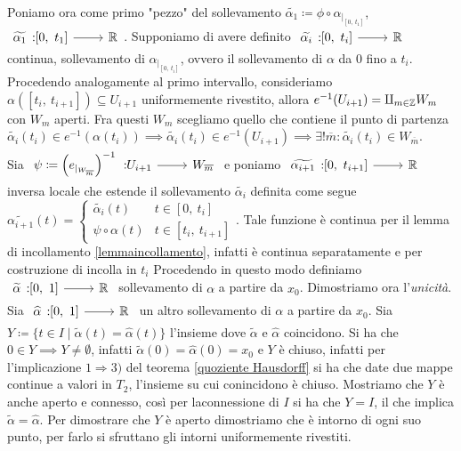 \begin{demonstration}
	Poniamo ora come primo "pezzo" del sollevamento $\widetilde{\alpha_1}\coloneqq \phi\circ \alpha_{|_{[0,\ t_1]}}$,  $\funz {\widetilde{\alpha_1}} {[0,\ t_1]} \realset$.
	Supponiamo di avere definito $\funz {\widetilde{\alpha_i}} {[0,\ t_i]} \realset$ continua, sollevamento di $\alpha_{|_{[0,\ t_i]}}$, ovvero il sollevamento di $\alpha$ da $0$ fino a $t_i$. Procedendo analogamente al primo intervallo, consideriamo $\alpha\left( [t_i,\ t_{i+1}] \right)\subseteq U_{i+1}$ uniformemente rivestito, allora $e^{-1}(U_{i+1})=\amalg_{m\in\mathbb{Z}} W_m$ con $W_m$ aperti. Fra questi $W_m$ scegliamo quello che contiene il punto di partenza \\  $\widetilde{\alpha_i}(t_i)\in e^{-1}\left( \alpha(t_i) \right) \implies \widetilde{\alpha_i}(t_i)\in e^{-1}\left( U_{i+1} \right) \implies \exists ! \overline{m} \colon \widetilde{\alpha_i}(t_i)\in W_{\overline{m}}.$\\
	Sia $\funz {\psi\coloneqq \left( e_{|_{W_{\overline{m}}}} \right)^{-1}} {U_{i+1}} {W_{\overline{m}}}$ e poniamo $\funz {\widetilde{\alpha_{i+1}}} {[0,\ t_{i+1}]} \realset$ inversa locale che estende il sollevamento $\widetilde{\alpha_i}$ definita come segue $\widetilde{\alpha_{i+1}}(t)= \begin{cases}
			\widetilde{\alpha_i}(t) & t\in [0,\ t_i]\\
			\psi\circ \alpha(t) & t\in[t_i,\ t_{i+1}]
		\end{cases}$. Tale funzione è continua per il lemma di incollamento \ref{lemmaincollamento}, infatti è continua separatamente e per costruzione di incolla in $t_i$\newline 
	Procedendo in questo modo definiamo $\funz {\widetilde{\alpha}} \intv \realset$ sollevamento di $\alpha$ a partire da $x_0$. \newline
	Dimostriamo ora l'\textit{unicità}. Sia $\funz {\widehat{\alpha}} \intv \realset$ un altro sollevamento di $\alpha$ a partire da $x_0$. Sia $Y \coloneqq \{t\in I \mid \widetilde{\alpha}(t)=\widehat{\alpha}(t)\}$ l'insieme dove $\widetilde{\alpha}$ e $\widehat{\alpha}$ coincidono. Si ha che $0\in Y \implies Y\neq\emptyset$, infatti $\widetilde{\alpha}(0)=\widehat{\alpha}(0)=x_0$  e $Y$ è chiuso, infatti per l'implicazione $1\Rightarrow 3)$ del teorema \ref{quoziente Hausdorff} si ha che date due mappe continue a valori in $T_2$, l'insieme su cui conincidono è chiuso. Mostriamo che $Y$ è anche aperto e connesso, così per laconnessione di $I$ si ha che $Y=I$, il che implica $\widetilde{\alpha}=\widehat{\alpha}$. Per dimostrare che $Y$ è aperto dimostriamo che è intorno di ogni suo punto, per farlo si sfruttano gli intorni uniformemente rivestiti.\\

\end{demonstration}

